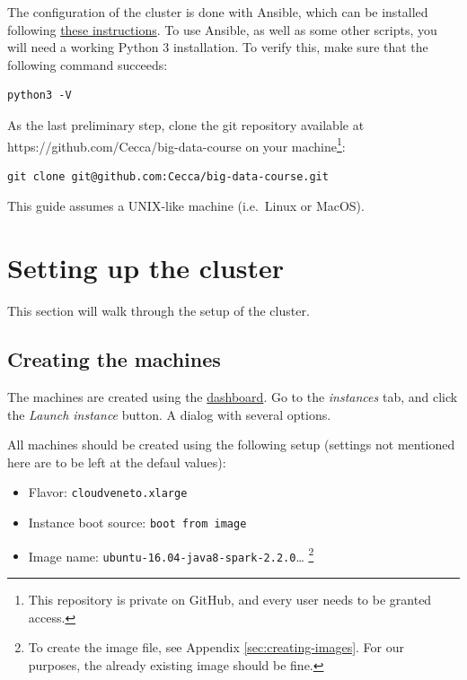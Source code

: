 \documentclass[justified]{tufte-handout}
\providecommand{\tightlist}{%
  \setlength{\itemsep}{0pt}\setlength{\parskip}{0pt}}
\begin{document}
The configuration of the cluster is done with Ansible, which can be
installed following
\href{https://docs.ansible.com/ansible/latest/installation_guide/intro_installation.html}{these
instructions}. To use Ansible, as well as some other scripts, you will
need a working Python 3 installation. To verify this, make sure that the
following command succeeds:

\begin{verbatim}
python3 -V
\end{verbatim}

As the last preliminary step, clone the git repository available at
https://github.com/Cecca/big-data-course on your machine\footnote{This
  repository is private on GitHub, and every user needs to be granted
  access.}:

\begin{verbatim}
git clone git@github.com:Cecca/big-data-course.git
\end{verbatim}

This guide assumes a UNIX-like machine (i.e.~Linux or MacOS).

\section{Setting up the cluster}\label{setting-up-the-cluster}

This section will walk through the setup of the cluster.

\subsection{Creating the machines}\label{creating-the-machines}

The machines are created using the
\href{https://cloudveneto.ict.unipd.it/dashboard}{dashboard}. Go to the
\emph{instances} tab, and click the \emph{Launch instance} button. A
dialog with several options.

All machines should be created using the following setup (settings not
mentioned here are to be left at the defaul values):

\begin{itemize}
\tightlist
\item
  Flavor: \texttt{cloudveneto.xlarge}
\item
  Instance boot source: \texttt{boot\ from\ image}
\item
  Image name: \texttt{ubuntu-16.04-java8-spark-2.2.0}\ldots{} \footnote{To
    create the image file, see Appendix \ref{sec:creating-images}. For
    our purposes, the already existing image should be fine.}
\end{itemize}
\end{document}
